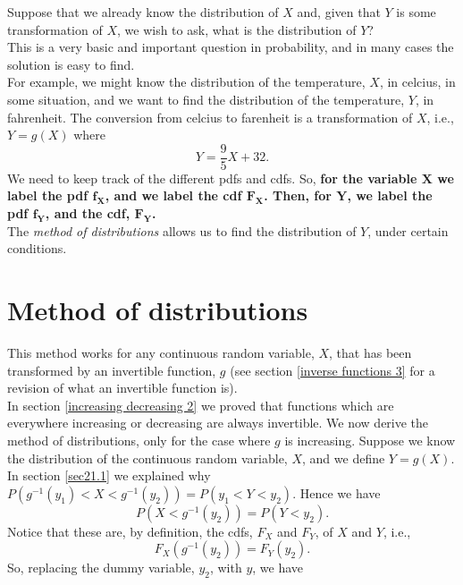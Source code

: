 \noindent Suppose that we already know the distribution of $X$ and, given that $Y$ is some transformation of $X$, we wish to ask, what is the distribution of $Y$? \\

\noindent This is a very basic and important question in probability, and in many cases the solution is easy to find. \\

\noindent For example, we might know the distribution of the temperature, $X$, in celcius, in some situation, and we want to find the distribution of the temperature, $Y$, in fahrenheit. The conversion from celcius to farenheit is a transformation of $X$, i.e., $Y = g(X)$ where
\[
Y = \frac{9}{5}X + 32.
\]
We need to keep track of the different pdfs and cdfs. So, \textbf{for the variable $\boldsymbol{X}$ we label the pdf $\boldsymbol{f_X}$, and we label the cdf $\boldsymbol{F_X}$. Then, for $\boldsymbol{Y}$, we label the pdf $\boldsymbol{f_Y}$, and the cdf, $\boldsymbol{F_Y}$.} \label{f_X,F_X} \\

\noindent The \textit{method of distributions} allows us to find the distribution of $Y$, under certain conditions.

\section{Method of distributions} \label{mdistributions}
This method works for any continuous random variable, $X$, that has been transformed by an invertible function, $g$ (see section \ref{inverse functions 3} for a revision of what an invertible function is). \\

\noindent In section \ref{increasing decreasing 2} we proved that functions which are everywhere increasing or decreasing are always invertible. We now derive the method of distributions, only for the case where $g$ is increasing. Suppose we know the distribution of the continuous random variable, $X$, and we define $Y = g(X)$. In section \ref{sec21.1} we explained why $P(g^{-1}(y_1) < X < g^{-1}(y_2)) = P(y_1 < Y < y_2)$. Hence we have
\[
P(X < g^{-1}(y_2)) = P(Y < y_2).
\]
Notice that these are, by definition, the cdfs, $F_X$ and $F_Y$, of $X$ and $Y$, i.e.,
\[
F_X(g^{-1}(y_2)) = F_Y(y_2).
\]
So, replacing the dummy variable, $y_2$, with $y$, we have 

  	\bigskip
	
	\hfil{}
	\bigskip

